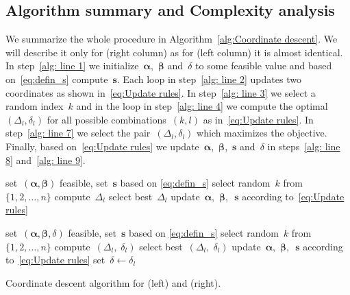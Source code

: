 \subsection{Algorithm summary and Complexity analysis}

We summarize the whole procedure in Algorithm~\ref{alg:Coordinate descent}. We will describe it only for \PatMat (right column) as for \TopPushK (left column) it is almost identical. In step~\ref{alg: line 1} we initialize~$\bm{\alpha}$,~$\bm{\beta}$ and~$\delta$ to some feasible value and based on~\eqref{eq:defin_s} compute~$\bm s$. Each \repeatloop loop in step~\ref{alg: line 2} updates two coordinates as shown in~\eqref{eq:Update rules}. In step~\ref{alg: line 3} we select a random index~$k$ and in the \forloop loop in step~\ref{alg: line 4} we compute the optimal~$(\Delta_l,\delta_l)$ for all possible combinations~$(k,l)$ as in~\eqref{eq:Update rules}. In step~\ref{alg: line 7} we select the pair~$(\Delta_l,\delta_l)$ which maximizes the objective. Finally, based on~\eqref{eq:Update rules} we update~$\bm{\alpha}$,~$\bm{\beta}$,~$\bm s$ and~$\delta$ in steps~\ref{alg: line 8} and~\ref{alg: line 9}.

\begin{algorithm*}[!ht]
  \begin{minipage}{0.48\textwidth}
    \centering
    \begin{algorithmic}[1]
      \State set~$(\bm{\alpha}, \bm{\beta})$ feasible, set~$\bm{s}$ based on \eqref{eq:defin_s} \label{alg: line 1}
      \Repeat \label{alg: line 2}
        \State select random~$k$ from~$\{1, 2, \ldots, n\}$ \label{alg: line 3}
         \label{alg: line 4}
            \State compute~$\Delta_{l}$  \label{alg: line 5}
        \EndFor
        \State select best~$\Delta_{l}$ \label{alg: line 7}
        \State update~$\bm{\alpha}$,~$\bm{\beta},$~$\bm{s}$ according to~\eqref{eq:Update rules} \label{alg: line 8}
        \State \label{alg: line 9}
    \end{algorithmic}
  \end{minipage}
  \hfill
  \begin{minipage}{0.51\textwidth}
    \centering
    \begin{algorithmic}[1]
      \State set~$(\bm{\alpha}, \bm{\beta}, \delta)$ feasible, set~$\bm{s}$ based on \eqref{eq:defin_s}
      \Repeat
        \State select random~$k$ from~$\{1, 2, \ldots, n\}$ 
            \State compute~$(\Delta_{l}, \; \delta_{l})$
        \EndFor
        \State select best~$(\Delta_{l}, \; \delta_{l})$
        \State update~$\bm{\alpha}$,~$\bm{\beta},$~$\bm{s}$ according to~\eqref{eq:Update rules}
        \State set~$\delta \leftarrow \delta_{l}$
    \end{algorithmic}
  \end{minipage}
  \caption{Coordinate descent algorithm for \TopPushK (left) and \PatMat (right).}
  \label{alg:Coordinate descent}
\end{algorithm*}

